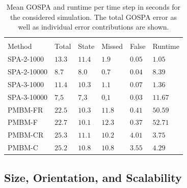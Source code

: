\documentclass[10pt, twoside, romanappendices]{IEEEtran}
\begin{document}
\begin{table}
\vspace{3mm}
\centering
\begin{small}
\hspace{-.5mm}\begin{tabular}{  C{1.75cm} | C{.85cm} |  C{.85cm} |  C{.85cm} |  C{.85cm}  |  C{.85cm}  }
\hline\\[-3.4mm]
{\rule{0mm}{3.8mm} Method}&{Total}&{State}&{Missed}&{False}&{Runtime}\\[1mm]
\hline

 SPA-2-1000 & $13.3$ & $11.4$ &  $1.9$& $0.05$ & \underline{$1.05$} \rule{0mm}{3.3mm} \\[1mm]

SPA-2-10000 & $8.7$  & $8.0$ & $0.7$& $0.04$& $8.39$ \rule{0mm}{3.3mm} \\[1mm]

 SPA-3-1000 & $11.4$ & $10.3$ &  $1.1$& $0.07$ & $1.36$ \rule{0mm}{3.3mm} \\[1mm]

SPA-3-10000 & $\underline{7.5}$  & $\underline{7.3}$ & $\underline{0.1}$& $\underline{0.03}$& $11.67$ \rule{0mm}{3.3mm} \\[1mm]

 PMBM-FR & $22.5$ & $10.3$ & $11.8$ & $0.41$ & $50.59$  \rule{0mm}{3.3mm} \\[1mm]

 PMBM-F & $22.7$& $10.1$ &  $12.3$ &  $0.37$ & $52.71$  \rule{0mm}{3.3mm} \\[1mm]

 PMBM-CR & $25.3$  & $11.1$ & $10.2$& $4.01$& $3.75$\rule{0mm}{3.3mm} \\[1mm]

PMBM-C & $25.2$  & $10.8$ &  $10.8$&$3.55$& $4.29$\rule{0mm}{3.3mm} \\[1mm]

\hline
\end{tabular}
\end{small}
\vspace{2.5mm}
\caption{Mean GOSPA and runtime per time step in seconds for the considered simulation. The total GOSPA error as well as individual error contributions are shown.} 
\label{fig:table1}
\end{table}

\subsection{Size, Orientation, and Scalability}
\label{sec:moreResults}
\end{document}
